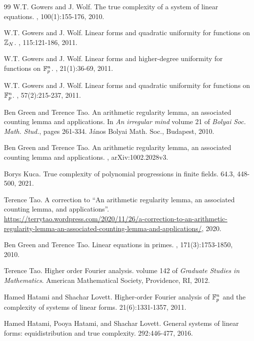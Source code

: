 \documentclass[10pt]{article}
\begin{document}
\begin{thebibliography}{99}
W.T. Gowers and J. Wolf.
\newblock The true complexity of a system of linear equations.
, 100(1):155-176, 2010.
	
W.T. Gowers and J. Wolf.
\newblock Linear forms and quadratic uniformity for functions on {$\Bbb Z_N$}.
, 115:121-186, 2011.

W.T. Gowers and J. Wolf.
\newblock Linear forms and higher-degree uniformity for functions on {$\Bbb F^n_p$}.
, 21(1):36-69, 2011.	


W.T. Gowers and J. Wolf.
\newblock Linear forms and quadratic uniformity for functions on {$\Bbb F^n_p$}.
, 57(2):215-237, 2011.	

		
Ben Green and Terence Tao.
\newblock An arithmetic regularity lemma, an associated counting lemma and applications.
\newblock In {\em An irregular mind} volume 21 of {\em Bolyai Soc. Math. Stud.}, pages 261-334.
János Bolyai Math. Soc., Budapest, 2010.


Ben Green and Terence Tao.
\newblock An arithmetic regularity lemma, an associated counting lemma and applications.
, arXiv:1002.2028v3.

Borys Kuca.
\newblock True complexity of polynomial progressions in finite fields.
 64.3, 448-500, 2021.

Terence Tao.
\newblock A correction to ``An arithmetic regularity lemma, an associated counting lemma, and applications''.
\newblock \url{https://terrytao.wordpress.com/2020/11/26/a-correction-to-an-arithmetic-regularity-lemma-an-associated-counting-lemma-and-applications/}, 2020.

Ben Green and Terence Tao. 
\newblock Linear equations in primes.
, 171(3):1753-1850,
2010.

Terence Tao. 
\newblock Higher order {F}ourier analysis.
\newblock volume 142 of {\em Graduate Studies in Mathematics}.
American Mathematical Society, Providence, RI, 2012.

Hamed Hatami and Shachar Lovett. 
\newblock Higher-order {F}ourier analysis of {$\Bbb F^n_p$} and the
              complexity of systems of linear forms.
 21(6):1331-1357, 2011.              
   
Hamed Hatami, Pooya Hatami, and Shachar Lovett.
\newblock General systems of linear forms: equidistribution and true
              complexity.
 292:446-477, 2016.


\end{thebibliography}
\end{document}
